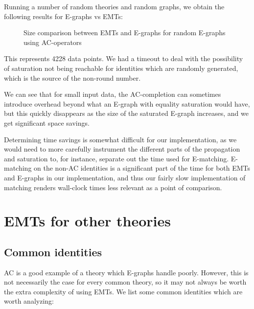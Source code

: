 \documentclass[12pt,a4paper,twoside,openright]{report}
\numberwithin{equation}{chapter}		%
\numberwithin{figure}{chapter}			%
\numberwithin{table}{chapter}			%
\theoremstyle{definition}
\theoremstyle{plain}
\begin{document}
Running a number of random theories and random graphs, we obtain the following results for E-graphs vs EMTs:

\begin{figure}[htbp]
    \centering
    
    \caption{Size comparison between EMTs and E-graphs for random E-graphs using AC-operators}
    \label{fig:good_bad_plot}
\end{figure}

This represents 4228 data points. We had a timeout to deal with the possibility of saturation not being reachable for identities which are randomly generated, which is the source of the non-round number.

We can see that for small input data, the AC-completion can sometimes introduce overhead beyond what an E-graph with equality saturation would have, but this quickly disappears as the size of the saturated E-graph increases, and we get significant space savings.

Determining time savings is somewhat difficult for our implementation, as we would need to more carefully instrument the different parts of the propagation and saturation to, for instance, separate out the time used for E-matching. E-matching on the non-AC identities is a significant part of the time for both EMTs and E-graphs in our implementation, and thus our fairly slow implementation of matching renders wall-clock times less relevant as a point of comparison.


\chapter{EMTs for other theories}
\section{Common identities}
AC is a good example of a theory which E-graphs handle poorly. However, this is not necessarily the case for every common theory, so it may not always be worth the extra complexity of using EMTs. We list some common identities which are worth analyzing:
\end{document}

